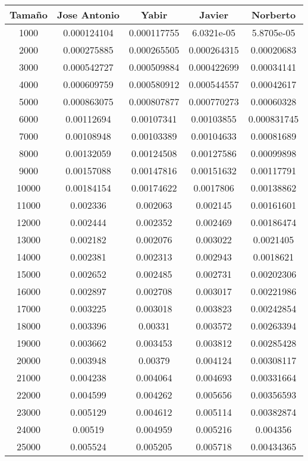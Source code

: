 \documentclass{article}
\begin{document}
\newpage
{}

\begin{tabular}{ | c | c  | c | c | c | }
  \hline
   Tama\~no & Jose Antonio & Yabir & Javier & Norberto\\ 
   \hline
1000	&	0.000124104	&	0.000117755	&	6.0321e-05	&	5.8705e-05	\\
2000	&	0.000275885	&	0.000265505	&	0.000264315	&	0.00020683	\\
3000	&	0.000542727	&	0.000509884	&	0.000422699	&	0.00034141	\\
4000	&	0.000609759	&	0.000580912	&	0.000544557	&	0.00042617	\\
5000	&	0.000863075	&	0.000807877	&	0.000770273	&	0.00060328	\\
6000	&	0.00112694	&	0.00107341	&	0.00103855	&	0.000831745	\\
7000	&	0.00108948	&	0.00103389	&	0.00104633	&	0.00081689	\\
8000	&	0.00132059	&	0.00124508	&	0.00127586	&	0.00099898	\\
9000	&	0.00157088	&	0.00147816	&	0.00151632	&	0.00117791	\\
10000	&	0.00184154	&	0.00174622	&	0.0017806	&	0.00138862	\\
11000	&	0.002336	&	0.002063	&	0.002145	&	0.00161601	\\
12000	&	0.002444	&	0.002352	&	0.002469	&	0.00186474	\\
13000	&	0.002182	&	0.002076	&	0.003022	&	0.0021405	\\
14000	&	0.002381	&	0.002313	&	0.002943	&	0.0018621	\\
15000	&	0.002652	&	0.002485	&	0.002731	&	0.00202306	\\
16000	&	0.002897	&	0.002708	&	0.003017	&	0.00221986	\\
17000	&	0.003225	&	0.003018	&	0.003823	&	0.00242854	\\
18000	&	0.003396	&	0.00331	&	0.003572	&	0.00263394	\\
19000	&	0.003662	&	0.003453	&	0.003812	&	0.00285428	\\
20000	&	0.003948	&	0.00379	&	0.004124	&	0.00308117	\\
21000	&	0.004238	&	0.004064	&	0.004693	&	0.00331664	\\
22000	&	0.004599	&	0.004262	&	0.005656	&	0.00356593	\\
23000	&	0.005129	&	0.004612	&	0.005114	&	0.00382874	\\
24000	&	0.00519	&	0.004959	&	0.005216	&	0.004356	\\
25000	&	0.005524	&	0.005205	&	0.005718	&	0.00434365	\\

  \hline
 \end{tabular}
 
\end{document}
